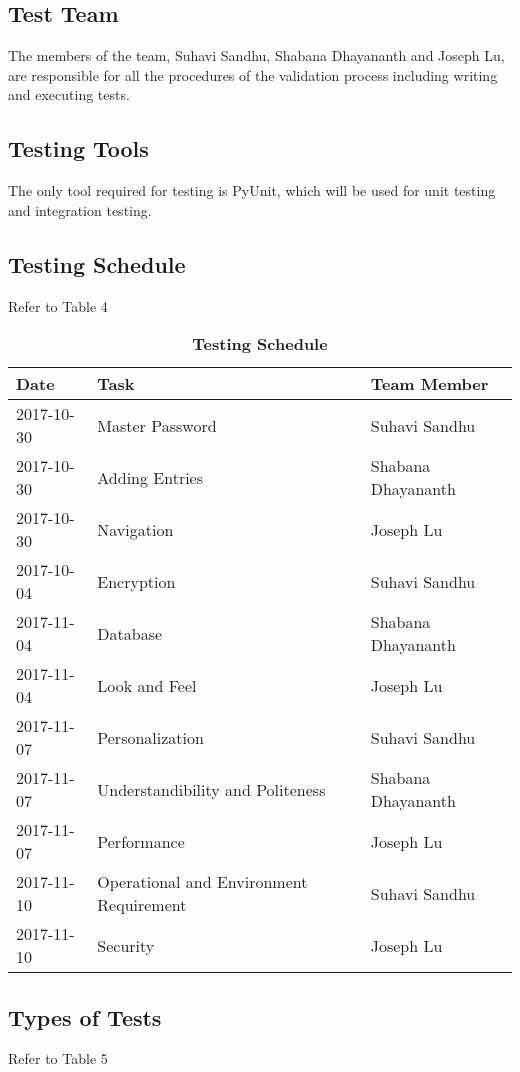 \documentclass[12pt, titlepage]{article}
\begin{document}
\subsection{Test Team}
The members of the team, Suhavi Sandhu, Shabana Dhayananth and Joseph Lu,  are responsible for all the procedures of the validation process including writing and executing tests.

\subsection{Testing Tools}
The only tool required for testing is PyUnit, which will be used for unit testing and integration testing.

\subsection{Testing Schedule}
Refer to Table 4
\begin{table}[!htbp]
    \caption{\textbf{Testing Schedule}} \label{2Table}
    \begin{tabularx}{\textwidth}{p{3cm}XX}
        \toprule
        \textbf{Date} & \textbf{Task} & \textbf{Team Member}\\
        \midrule
        2017-10-30 & Master Password & Suhavi Sandhu\\
        2017-10-30 & Adding Entries & Shabana Dhayananth\\
        2017-10-30 & Navigation & Joseph Lu\\
        2017-10-04 & Encryption & Suhavi Sandhu\\
        2017-11-04 & Database & Shabana Dhayananth\\
        2017-11-04 & Look and Feel & Joseph Lu\\
        2017-11-07 & Personalization & Suhavi Sandhu\\
        2017-11-07 & Understandibility and Politeness & Shabana Dhayananth\\
        2017-11-07 & Performance & Joseph Lu\\
        2017-11-10 & Operational and Environment Requirement & Suhavi Sandhu\\
        2017-11-10 & Security & Joseph Lu\\
        \bottomrule
    \end{tabularx}
\end{table}

\subsection{Types of Tests}
Refer to Table 5
\end{document}
